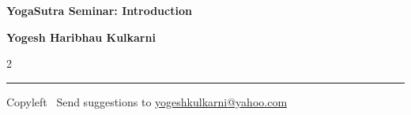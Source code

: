 \documentclass[9pt,a4paper,landscape]{article}
\begin{document}
\footnotesize


\begin{center}
\Large{\textbf{YogaSutra Seminar: Introduction}}  

\small{\textbf{Yogesh Haribhau Kulkarni}}  
\end{center}

\begin{multicols}{2}

\end{multicols}

\rule{\linewidth}{0.25pt}
\scriptsize
Copyleft \textcopyleft\  Send suggestions to 
\href{http://www.yogeshkulkarni.com}{yogeshkulkarni@yahoo.com}
\end{document}
